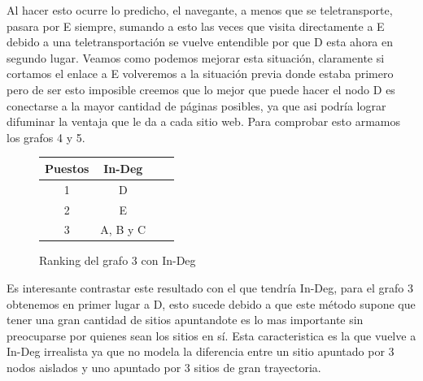 Al hacer esto ocurre lo predicho, el navegante, a menos que se teletransporte, pasara por E siempre, sumando a esto las veces que visita directamente a E debido a una teletransportación se vuelve entendible por que D esta ahora en segundo lugar. Veamos como podemos mejorar esta situación, claramente si cortamos el enlace a E volveremos a la situación previa donde estaba primero pero de ser esto imposible creemos que lo mejor que puede hacer el nodo D es conectarse a la mayor cantidad de páginas posibles, ya que asi podría lograr difuminar la ventaja que le da a cada sitio web. Para comprobar esto armamos los grafos 4 y 5.

\begin{figure}[H]
\centering
\begin{tabular}{| c | c | c | c |}
  \hline
  Puestos & In-Deg\\ \hline \hline
  1 & D\\ \hline
  2 & E\\ \hline
  3 & A, B y C\\ \hline
\end{tabular}
  \caption{\footnotesize{Ranking del grafo 3 con In-Deg}}
  \label{fig:Rankings}
\end{figure}


Es interesante contrastar este resultado con el que tendría In-Deg, para el grafo 3 obtenemos en primer lugar a D, esto sucede debido a que este método supone que tener una gran cantidad de sitios apuntandote es lo mas importante sin preocuparse por quienes sean los sitios en sí. Esta caracteristica es la que vuelve a In-Deg irrealista ya que no modela la diferencia entre un sitio apuntado por 3 nodos aislados y uno apuntado por 3 sitios de gran trayectoria.

